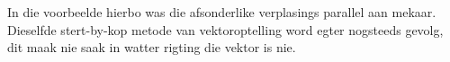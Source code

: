 In die voorbeelde hierbo was die afsonderlike verplasings parallel aan mekaar. Dieselfde stert-by-kop metode van vektoroptelling word egter nogsteeds gevolg, dit maak nie saak in watter rigting die vektor is nie.






